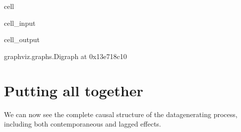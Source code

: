 \documentclass[letterpaper,10pt,english]{jupyterBook}
\begin{document}
\begin{sphinxuseclass}{cell}\begin{sphinxVerbatimInput}

\begin{sphinxuseclass}{cell_input}
\begin{sphinxVerbatim}[commandchars=\\\{\}]
  \PYG{p}{[}  \PYG{p}{]}
 
\end{sphinxVerbatim}

\end{sphinxuseclass}\end{sphinxVerbatimInput}
\begin{sphinxVerbatimOutput}

\begin{sphinxuseclass}{cell_output}
\begin{sphinxVerbatim}[commandchars=\\\{\}]
\PYGZlt{}graphviz.graphs.Digraph at 0x13e718c10\PYGZgt{}
\end{sphinxVerbatim}

\end{sphinxuseclass}\end{sphinxVerbatimOutput}

\end{sphinxuseclass}

\section{Putting all together}
\label{\detokenize{notebooks/semiparametric_varlingam:putting-all-together}}
\sphinxAtStartPar
We can now see the complete causal structure of the data\sphinxhyphen{}generating process, including both contemporaneous and lagged effects.
\end{document}
